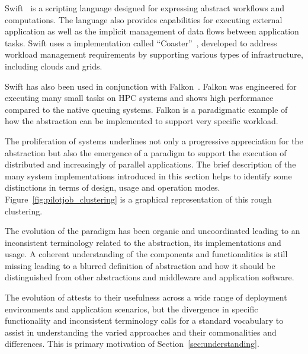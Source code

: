 \documentclass{sig-alternate}
\begin{document}
Swift~\cite{Wilde2011} is a scripting language designed for expressing abstract
workflows and computations. The language also provides capabilities for
executing external application as well as the implicit management of data flows
between application tasks. Swift uses a \pilot implementation called
``Coaster''~\cite{coasters}, developed to address workload management
requirements by supporting various types of infrastructure, including clouds and
grids.

Swift has also been used in conjunction with Falkon~\cite{1362680}. Falkon was
engineered for executing many small tasks on HPC systems and shows high
performance compared to the native queuing systems. Falkon is a paradigmatic
example of how the \pilot abstraction can be implemented to support very
specific workload.

The proliferation of \pilotjob systems underlines not only a progressive
appreciation for the \pilot abstraction but also the emergence of a \pilot
paradigm to support the execution of distributed and increasingly of parallel
applications. The brief description of the many \pilotjob system implementations
introduced in this section helps to identify some distinctions in terms of
design, usage and operation modes. Figure~\ref{fig:pilotjob_clustering} is a
graphical representation of this rough clustering.

The evolution of the \pilot paradigm has been organic and uncoordinated leading
to an inconsistent terminology related to the \pilot abstraction, its
implementations and usage. A coherent understanding of the \pilot components and
functionalities is still missing leading to a blurred definition of \pilot
abstraction and how it should be distinguished from other abstractions and
middleware and application software.

The evolution of \pilots attests to their usefulness across a wide range of
deployment environments and application scenarios, but the divergence in
specific functionality and inconsistent terminology calls for a standard
vocabulary to assist in understanding the varied approaches and their
commonalities and differences. This is primary motivation of
Section~\ref{sec:understanding}.




\newcommand{\vocab}[1]{\textbf{#1}\xspace}
\newcommand{\prop}[1]{\textit{#1}\xspace}
\newcommand{\impterm}[1]{\texttt{#1}\xspace}
\end{document}
